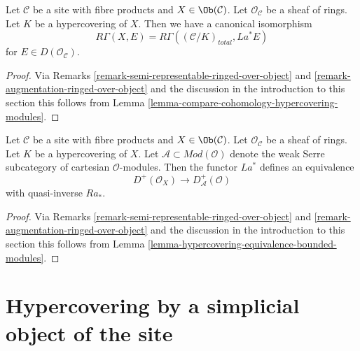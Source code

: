 \begin{lemma}
\label{lemma-compare-cohomology-hypercovering-X-modules}
Let $\mathcal{C}$ be a site with fibre products and $X \in \Ob(\mathcal{C})$.
Let $\mathcal{O}_\mathcal{C}$ be a sheaf of rings.
Let $K$ be a hypercovering of $X$.
Then we have a canonical isomorphism
$$
R\Gamma(X, E) = R\Gamma((\mathcal{C}/K)_{total}, La^*E)
$$
for $E \in D(\mathcal{O}_\mathcal{C})$.
\end{lemma}

\begin{proof}
Via Remarks \ref{remark-semi-representable-ringed-over-object} and
\ref{remark-augmentation-ringed-over-object} and the discussion in
the introduction to this section
this follows from Lemma \ref{lemma-compare-cohomology-hypercovering-modules}.
\end{proof}

\begin{lemma}
\label{lemma-hypercovering-X-equivalence-bounded-modules}
Let $\mathcal{C}$ be a site with fibre products and $X \in \Ob(\mathcal{C})$.
Let $\mathcal{O}_\mathcal{C}$ be a sheaf of rings.
Let $K$ be a hypercovering of $X$.
Let $\mathcal{A} \subset \textit{Mod}(\mathcal{O})$
denote the weak Serre subcategory of cartesian $\mathcal{O}$-modules.
Then the functor $La^*$ defines an equivalence
$$
D^+(\mathcal{O}_X) \longrightarrow D_\mathcal{A}^+(\mathcal{O})
$$
with quasi-inverse $Ra_*$.
\end{lemma}

\begin{proof}
Via Remarks \ref{remark-semi-representable-ringed-over-object} and
\ref{remark-augmentation-ringed-over-object} and the discussion in
the introduction to this section
this follows from Lemma \ref{lemma-hypercovering-equivalence-bounded-modules}.
\end{proof}










\section{Hypercovering by a simplicial object of the site}
\label{section-hypercovering}

